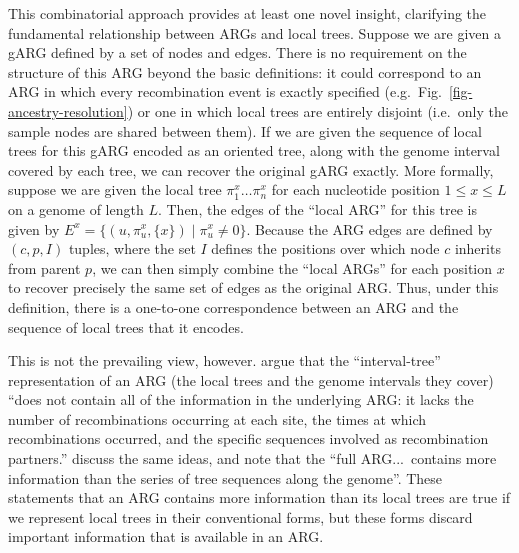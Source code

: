 \documentclass{article}
\begin{document}
This combinatorial approach provides at least
one novel insight, clarifying the fundamental relationship between
ARGs and local trees.
Suppose we are given a gARG defined by a set of nodes and edges.
There is no requirement on the structure of this ARG beyond
the basic definitions: it could correspond to an ARG in which
every recombination event is exactly specified
(e.g.\ Fig.~\ref{fig-ancestry-resolution})
or one in which local trees are entirely disjoint
(i.e.\ only the sample nodes are shared between them).
If we  are given the sequence of local trees for this gARG
encoded as an oriented tree, along with the genome interval
covered by each tree, we can recover the original gARG exactly.
More formally, suppose we are given the local tree $\pi^x_1\dots\pi^x_n$
for each nucleotide position $1 \leq x \leq L$ on a genome of length $L$.
Then, the edges of the ``local ARG'' for this tree is given by
$E^x = \{(u, \pi_u^x, \{x\}) \mid \pi_u^x \neq 0\}$. Because the ARG
edges are defined by $(c, p, I)$ tuples, where the set $I$ defines
the positions over which node $c$ inherits from parent $p$, we can
then simply combine the ``local ARGs'' for each position $x$
to recover precisely the same set of edges as the original ARG.
Thus, under this definition, there
is a one-to-one correspondence between an ARG and
the sequence of local trees that it encodes.

This is not the prevailing view, however.
\cite{kuhner2017consensus} argue that the
``interval-tree'' representation of
an ARG (the local trees and the genome intervals they cover)
``does not contain all of the information in the underlying ARG: it lacks the
number of recombinations occurring at each site, the times at which
recombinations occurred, and the specific sequences involved as recombination
partners.''
\cite{shipilina2023origin} discuss the same ideas,
and note that the
``full ARG...~contains more information than the series of tree
sequences along the genome''.
These
%
statements that an ARG
contains more information than its local trees are true
if we represent local trees in their conventional forms,
but these forms discard important information that is
available in an ARG.
\end{document}
